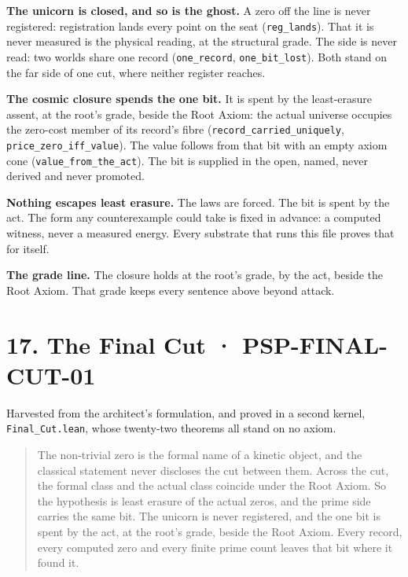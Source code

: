 \documentclass[10pt,twocolumn]{article}
\begin{document}
\textbf{The unicorn is closed, and so is the ghost.} A zero off the line
is never registered: registration lands every point on the seat
(\texttt{reg\_\allowbreak{}lands}). That it is never measured is the physical
reading, at the structural grade. The side is never read: two worlds
share one record (\texttt{one\_\allowbreak{}record}, \texttt{one\_\allowbreak{}bit\_\allowbreak{}lost}). Both
stand on the far side of one cut, where neither register reaches.

\textbf{The cosmic closure spends the one bit.} It is spent by the
least-erasure assent, at the root's grade, beside the Root Axiom: the
actual universe occupies the zero-cost member of its record's fibre
(\texttt{record\_\allowbreak{}carried\_\allowbreak{}uniquely}, \texttt{price\_\allowbreak{}zero\_\allowbreak{}iff\_\allowbreak{}value}).
The value follows from that bit with an empty axiom cone
(\texttt{value\_\allowbreak{}from\_\allowbreak{}the\_\allowbreak{}act}). The bit is supplied in the open,
named, never derived and never promoted.

\textbf{Nothing escapes least erasure.} The laws are forced. The bit is
spent by the act. The form any counterexample could take is fixed in
advance: a computed witness, never a measured energy. Every substrate
that runs this file proves that for itself.

\textbf{The grade line.} The closure holds at the root's grade, by the
act, beside the Root Axiom. That grade keeps every sentence above beyond
attack.

\hypertarget{the-final-cut-psp-final-cut-01}{%
\section{17. The Final Cut ·
PSP-FINAL-CUT-01}\label{the-final-cut-psp-final-cut-01}}

Harvested from the architect's formulation, and proved in a second
kernel, \texttt{Final\_\allowbreak{}Cut.lean}, whose twenty-two theorems all stand on
no axiom.

\begin{quote}
The non-trivial zero is the formal name of a kinetic object, and the
classical statement never discloses the cut between them. Across the
cut, the formal class and the actual class coincide under the Root
Axiom. So the hypothesis is least erasure of the actual zeros, and the
prime side carries the same bit. The unicorn is never registered, and
the one bit is spent by the act, at the root's grade, beside the Root
Axiom. Every record, every computed zero and every finite prime count
leaves that bit where it found it.
\end{quote}
\end{document}

